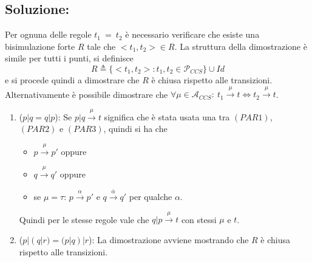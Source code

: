 \documentclass[a4paper,twosides]{report}
\begin{document}
\subsection*{Soluzione:}
Per ognuna delle regole $t_1\ =\ t_2$ \`e necessario verificare che esiste una
bisimulazione forte $R$ tale che $<t_1,t_2>\in R$. La struttura della
dimostrazione \`e simile per tutti i punti, si definisce
$$
R\triangleq\{<t_1,t_2>:t_1,t_2\in\mathcal{P}_{CCS}\}\cup Id
$$
e si procede quindi a dimostrare che $R$ \`e chiusa rispetto alle
transizioni. Alternativamente \`e possibile dimostrare che
$\forall\mu\in\mathcal{A}_{CCS}:\ t_1\xrightarrow{\mu}t\iff
t_2\xrightarrow{\mu}t$. 
\begin{enumerate}
\item ($p|q=q|p$): Se $p|q\xrightarrow{\mu}t$ significa che è stata usata una tra
  $(PAR1)$, $(PAR2)$ e $(PAR3)$, quindi si ha che
  \begin{itemize}
  \item $p\xrightarrow{\mu}p'$ oppure
  \item $q\xrightarrow{\mu}q'$ oppure
  \item se $\mu = \tau$: $p\xrightarrow{\alpha}p'$ e
    $q\xrightarrow{\overline{\alpha}}q'$ per qualche $\alpha$.
  \end{itemize}
  Quindi per le stesse regole vale che $q|p\xrightarrow{\mu}t$ con
  stessi $\mu$ e $t$.
\item ($p|(q|r)=(p|q)|r$): La dimostrazione avviene mostrando che
  $R$ \`e chiusa rispetto alle transizioni.


\end{enumerate}
\end{document}
